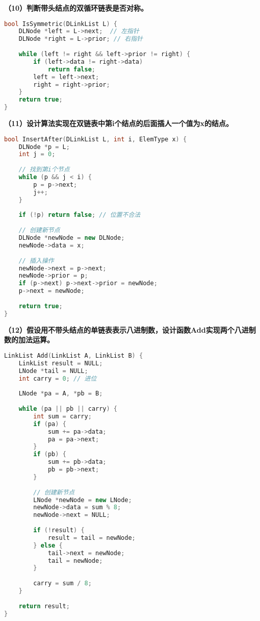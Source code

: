 \documentclass[12pt,a4paper]{amsart}
\begin{document}
\textbf{（10）判断带头结点的双循环链表是否对称。}

\begin{lstlisting}[language=C++]
bool IsSymmetric(DLinkList L) {
    DLNode *left = L->next;  // 左指针
    DLNode *right = L->prior; // 右指针
    
    while (left != right && left->prior != right) {
        if (left->data != right->data)
            return false;
        left = left->next;
        right = right->prior;
    }
    return true;
}
\end{lstlisting}

\textbf{（11）设计算法实现在双链表中第i个结点的后面插人一个值为x的结点。}

\begin{lstlisting}[language=C++]
bool InsertAfter(DLinkList L, int i, ElemType x) {
    DLNode *p = L;
    int j = 0;
    
    // 找到第i个节点
    while (p && j < i) {
        p = p->next;
        j++;
    }
    
    if (!p) return false; // 位置不合法
    
    // 创建新节点
    DLNode *newNode = new DLNode;
    newNode->data = x;
    
    // 插入操作
    newNode->next = p->next;
    newNode->prior = p;
    if (p->next) p->next->prior = newNode;
    p->next = newNode;
    
    return true;
}
\end{lstlisting}

\textbf{（12）假设用不带头结点的单链表表示八进制数，设计函数Add实现两个八进制数的加法运算。}

\begin{lstlisting}[language=C++]
LinkList Add(LinkList A, LinkList B) {
    LinkList result = NULL;
    LNode *tail = NULL;
    int carry = 0; // 进位
    
    LNode *pa = A, *pb = B;
    
    while (pa || pb || carry) {
        int sum = carry;
        if (pa) {
            sum += pa->data;
            pa = pa->next;
        }
        if (pb) {
            sum += pb->data;
            pb = pb->next;
        }
        
        // 创建新节点
        LNode *newNode = new LNode;
        newNode->data = sum % 8;
        newNode->next = NULL;
        
        if (!result) {
            result = tail = newNode;
        } else {
            tail->next = newNode;
            tail = newNode;
        }
        
        carry = sum / 8;
    }
    
    return result;
}
\end{lstlisting}
\end{document}
